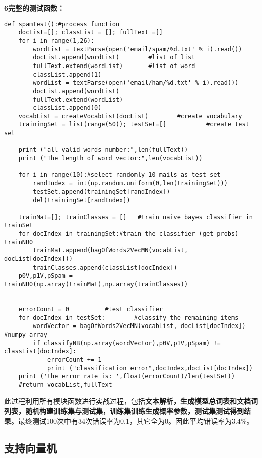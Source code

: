 \noindent\textbf{\textcircled{\footnotesize{6}}完整的测试函数：}
\begin{lstlisting}
def spamTest():#process function
    docList=[]; classList = []; fullText =[]
    for i in range(1,26):
        wordList = textParse(open('email/spam/%d.txt' % i).read())
        docList.append(wordList)        #list of list
        fullText.extend(wordList)       #list of word
        classList.append(1)
        wordList = textParse(open('email/ham/%d.txt' % i).read())
        docList.append(wordList)
        fullText.extend(wordList)
        classList.append(0)
    vocabList = createVocabList(docList)        #create vocabulary
    trainingSet = list(range(50)); testSet=[]           #create test set

    print ("all valid words number:",len(fullText))
    print ("The length of word vector:",len(vocabList))

    for i in range(10):#select randomly 10 mails as test set
        randIndex = int(np.random.uniform(0,len(trainingSet)))
        testSet.append(trainingSet[randIndex])
        del(trainingSet[randIndex])

    trainMat=[]; trainClasses = []   #train naive bayes classifier in trainSet
    for docIndex in trainingSet:#train the classifier (get probs) trainNB0
        trainMat.append(bagOfWords2VecMN(vocabList, docList[docIndex]))
        trainClasses.append(classList[docIndex])
    p0V,p1V,pSpam = trainNB0(np.array(trainMat),np.array(trainClasses))


    errorCount = 0          #test classifier
    for docIndex in testSet:        #classify the remaining items
        wordVector = bagOfWords2VecMN(vocabList, docList[docIndex])   #numpy array
        if classifyNB(np.array(wordVector),p0V,p1V,pSpam) != classList[docIndex]:
            errorCount += 1
            print ("classification error",docIndex,docList[docIndex])
    print ('the error rate is: ',float(errorCount)/len(testSet))
    #return vocabList,fullText
\end{lstlisting}

此过程利用所有模块函数进行实战过程，包括\textbf{文本解析，生成模型总词表和文档词列表，随机构建训练集与测试集，训练集训练生成概率参数，测试集测试得到结果}。最终测试100次中有34次错误率为0.1，其它全为0。因此平均错误率为3.4\%。


\newpage
\subsection{支持向量机}
